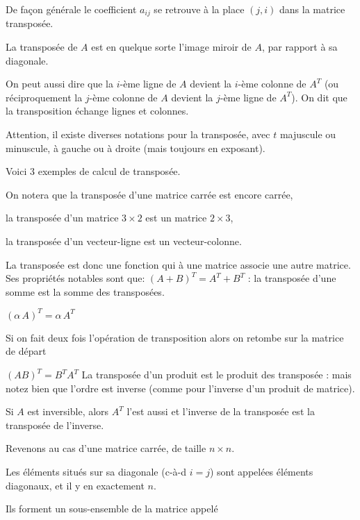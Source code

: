 \change
De façon générale le coefficient $a_{ij}$ se retrouve à la place $(j,i)$ dans la matrice transposée.


La transposée de $A$ est en quelque sorte l'image miroir de $A$, par rapport à sa diagonale.

\change
On peut aussi dire que la $i$-ème ligne de $A$ devient la $i$-ème colonne de $A^{T}$ 
(ou réciproquement la $j$-ème colonne de $A$ devient la $j$-ème ligne de $A^{T}$).
On dit que la transposition échange lignes et colonnes.

\change
Attention, il existe diverses notations pour la transposée, avec $t$ majuscule ou minuscule,
à gauche ou à droite (mais toujours en exposant).

\diapo

Voici 3 exemples de calcul de transposée. 

On notera que la transposée d'une matrice carrée 
est encore carrée, 

la transposée d'un matrice $3\times 2$ est un matrice $2\times 3$,

la transposée d'un vecteur-ligne est un vecteur-colonne. 

\change
La transposée est donc une fonction qui à une matrice associe une autre matrice. 
Ses propriétés notables sont que: $(A + B)^T = A^T + B^T$ :
la transposée d'une somme est la somme des transposées.

\change
$(\alpha \, A)^T = \alpha \, A^T $

\change
Si on fait deux fois l'opération de transposition alors on retombe sur la matrice de départ 


\change
$(AB)^T = B^T A^T$ 
La transposée d'un produit est le produit des transposée : mais notez bien
que l'ordre est inverse (comme pour l'inverse d'un produit de matrice).


\change
Si $A$ est inversible, alors $A^T$ l'est aussi et l'inverse de la transposée est
la transposée de l'inverse.

\diapo

Revenons au cas d'une matrice carrée, de taille $n \times n$.

\change
Les éléments situés sur sa diagonale (c-à-d $i=j$) sont appelées éléments diagonaux,
et il y en exactement $n$.

\change
Ils forment un sous-ensemble de la matrice appelé 

